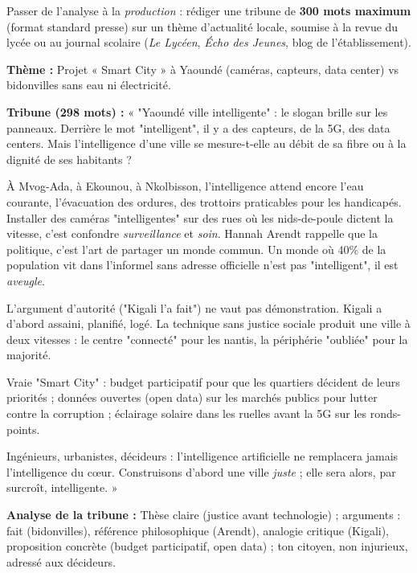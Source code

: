 \documentclass[11pt]{article}
\begin{document}
Passer de l'analyse à la \emph{production} : rédiger une tribune de \textbf{300 mots maximum} (format standard presse) sur un thème d'actualité locale, soumise à la revue du lycée ou au journal scolaire (\emph{Le Lycéen}, \emph{Écho des Jeunes}, blog de l'établissement).

\begin{exoresolu}
\textbf{Thème :} Projet « Smart City » à Yaoundé (caméras, capteurs, data center) vs bidonvilles sans eau ni électricité.

\textbf{Tribune (298 mots) :}
« "Yaoundé ville intelligente" : le slogan brille sur les panneaux. Derrière le mot "intelligent", il y a des capteurs, de la 5G, des data centers. Mais l'intelligence d'une ville se mesure-t-elle au débit de sa fibre ou à la dignité de ses habitants ?

À Mvog-Ada, à Ekounou, à Nkolbisson, l'intelligence attend encore l'eau courante, l'évacuation des ordures, des trottoirs praticables pour les handicapés. Installer des caméras "intelligentes" sur des rues où les nids-de-poule dictent la vitesse, c'est confondre \emph{surveillance} et \emph{soin}. Hannah Arendt rappelle que la politique, c'est l'art de partager un monde commun. Un monde où 40\% de la population vit dans l'informel sans adresse officielle n'est pas "intelligent", il est \emph{aveugle}.

L'argument d'autorité ("Kigali l'a fait") ne vaut pas démonstration. Kigali a d'abord assaini, planifié, logé. La technique sans justice sociale produit une ville à deux vitesses : le centre "connecté" pour les nantis, la périphérie "oubliée" pour la majorité.

Vraie "Smart City" : budget participatif pour que les quartiers décident de leurs priorités ; données ouvertes (open data) sur les marchés publics pour lutter contre la corruption ; éclairage solaire dans les ruelles avant la 5G sur les ronds-points.

Ingénieurs, urbanistes, décideurs : l'intelligence artificielle ne remplacera jamais l'intelligence du cœur. Construisons d'abord une ville \emph{juste} ; elle sera alors, par surcroît, intelligente. »

\tcblower
\textbf{Analyse de la tribune :} Thèse claire (justice avant technologie) ; arguments : fait (bidonvilles), référence philosophique (Arendt), analogie critique (Kigali), proposition concrète (budget participatif, open data) ; ton citoyen, non injurieux, adressé aux décideurs.
\end{exoresolu}
\end{document}
